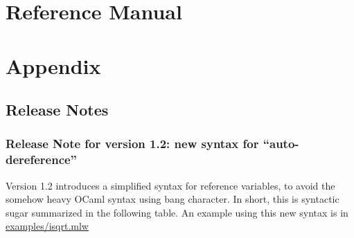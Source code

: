 \documentclass[a4paper,11pt,twoside,openright]{memoir}
\begin{document}
% 

% 





\part{Reference Manual}









% 








\part{Appendix}

\appendix

\chapter{Release Notes}

\section{Release Note for version 1.2: new syntax for ``auto-dereference''}

Version 1.2 introduces a simplified syntax for reference variables, to
avoid the somehow heavy OCaml syntax using bang character. In short,
this is syntactic sugar summarized in the following table.  An example
using this new syntax is in \url{examples/isqrt.mlw}
\end{document}
